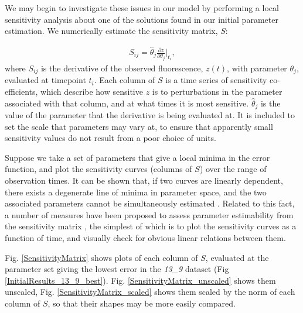 \documentclass[10pt,journal]{./IEEE_latex_class/IEEEtran}
\begin{document}
 We may begin to investigate these issues in our model by performing a local sensitivity analysis about one of the solutions found in our initial parameter estimation. We numerically estimate the sensitivity matrix, $S$:
 
 \begin{align}
S_{ij} = \hat{\theta}_{j} \frac{\partial z}{ \partial \theta_{j}}\Bigr|_{t_{i}},
\label{eq:Sensitivity}
\end{align}
where $S_{ij}$ is the derivative of the observed fluorescence, $z(t)$, with parameter $\theta_{j}$, evaluated at timepoint $t_{i}$. Each column of $S$ is a time series of sensitivity co-efficients, which describe how sensitive $z$ is to perturbations in the parameter associated with that column, and at what times it is most sensitive. $\hat{\theta}_{j}$ is the value of the parameter that the derivative is being evaluated at. It is included to set the scale that parameters may vary at, to ensure that apparently small sensitivity values do not result from a poor choice of units.

Suppose we take a set of parameters that give a local minima in the error function, and plot the sensitivity curves (columns of $S$)  over the range of observation times. It can be shown that, if two curves are linearly dependent, there exists a degenerate line of minima in parameter space, and the two associated parameters cannot be simultaneously estimated \cite{Beck}. Related to this fact, a number of measures have been proposed to assess parameter estimability from the sensitivity matrix \cite{Mclean2012}, the simplest of which is to plot the sensitivity curves as a function of time, and visually check for obvious linear relations between them.

Fig. \ref{SensitivityMatrix} shows plots of each column of $S$, evaluated at the parameter set giving the lowest error in the \textit{13\_9} dataset (Fig \ref{InitialResults_13_9_best}). Fig. \ref{SensitivityMatrix_unscaled} shows them unscaled, Fig. \ref{SensitivityMatrix_scaled} shows them scaled by the norm of each column of $S$, so that their shapes may be more easily compared.
\end{document}

